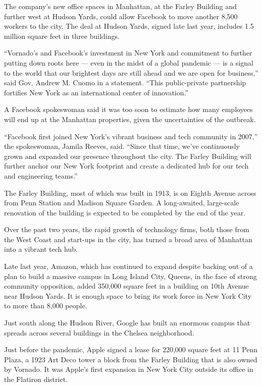 The company's new office spaces in Manhattan, at the Farley Building and
further west at Hudson Yards, could allow Facebook to move another 8,500
workers to the city. The deal at Hudson Yards, signed late last year,
includes 1.5 million square feet in three buildings.

``Vornado's and Facebook's investment in New York and commitment to
further putting down roots here --- even in the midst of a global
pandemic --- is a signal to the world that our brightest days are still
ahead and we are open for business,'' said Gov. Andrew M. Cuomo in a
statement. ``This public-private partnership fortifies New York as an
international center of innovation.''

A Facebook spokeswoman said it was too soon to estimate how many
employees will end up at the Manhattan properties, given the
uncertainties of the outbreak.

``Facebook first joined New York's vibrant business and tech community
in 2007,'' the spokeswoman, Jamila Reeves, said. ``Since that time,
we've continuously grown and expanded our presence throughout the city.
The Farley Building will further anchor our New York footprint and
create a dedicated hub for our tech and engineering teams.''

The Farley Building, most of which was built in 1913, is on Eighth
Avenue across from Penn Station and Madison Square Garden. A
long-awaited, large-scale renovation of the building is expected to be
completed by the end of the year.

Over the past two years, the rapid growth of technology firms, both
those from the West Coast and start-ups in the city, has turned a broad
area of Manhattan into a vibrant tech hub.

Late last year, Amazon, which has continued to expand despite backing
out of a plan to build a massive campus in Long Island City, Queens, in
the face of strong community opposition, added 350,000 square feet in a
building on 10th Avenue near Hudson Yards. It is enough space to bring
its work force in New York City to more than 8,000 people.

Just south along the Hudson River, Google has built an enormous campus
that spreads across several buildings in the Chelsea neighborhood.

Just before the pandemic, Apple signed a lease for 220,000 square feet
at 11 Penn Plaza, a 1923 Art Deco tower a block from the Farley Building
that is also owned by Vornado. It was Apple's first expansion in New
York City outside its office in the Flatiron district.

